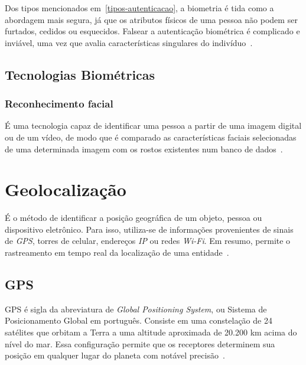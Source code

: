 Dos tipos mencionados em~\ref{tipos-autenticacao}, a biometria é tida como a abordagem mais segura, já que os atributos físicos de uma pessoa não podem ser furtados, cedidos ou esquecidos.
Falsear a autenticação biométrica é complicado e inviável, uma vez que avalia características singulares do indivíduo~\cite{dos2019tecnologias}.

\subsection{Tecnologias Biométricas}\label{subsec:biometria-tecnologias}

\subsubsection{Reconhecimento facial}\label{subsubsec:reconhecimento-facial}
É uma tecnologia capaz de identificar uma pessoa a partir de uma imagem digital ou de um vídeo, de modo que é comparado as características faciais selecionadas de uma determinada imagem com os rostos existentes num banco de dados~\cite{orvalho2019reconhecimento}.




\section{Geolocalização}\label{sec:geolocalizacao}
É o método de identificar a posição geográfica de um objeto, pessoa ou dispositivo eletrônico.
Para isso, utiliza-se de informações provenientes de sinais de \textit{GPS}, torres de celular, endereços \textit{IP} ou redes  \textit{Wi-Fi}.
Em resumo, permite o rastreamento em tempo real da localização de uma entidade~\cite{da2019sistemas}.

\subsection{GPS}\label{subsec:gps}
GPS é sigla da abreviatura de \textit{Global Positioning System}, ou Sistema de Posicionamento Global em português.
Consiste em uma constelação de 24 satélites que orbitam a Terra a uma altitude aproximada de 20.200 km acima do nível do mar.
Essa configuração permite que os receptores determinem sua posição em qualquer lugar do planeta com notável precisão~\cite{el2002introduction}.

